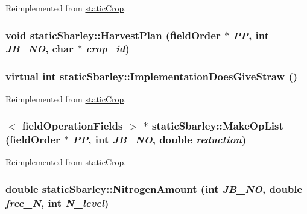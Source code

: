 Reimplemented from \hyperlink{classstatic_crop_afe0cb8a7831afa941a37338f05227d67}{staticCrop}.\hypertarget{classstatic_sbarley_abdb535e92f8862e38dc0f6860d54cd80}{
\subsubsection[{HarvestPlan}]{\setlength{\rightskip}{0pt plus 5cm}void staticSbarley::HarvestPlan ({\bf fieldOrder} $\ast$ {\em PP}, \/  int {\em JB\_\-NO}, \/  char $\ast$ {\em crop\_\-id})}}
\label{classstatic_sbarley_abdb535e92f8862e38dc0f6860d54cd80}
\hypertarget{classstatic_sbarley_a0d32acc147f8af10e83d0292396db1d2}{
\subsubsection[{ImplementationDoesGiveStraw}]{\setlength{\rightskip}{0pt plus 5cm}virtual int staticSbarley::ImplementationDoesGiveStraw ()}}
\label{classstatic_sbarley_a0d32acc147f8af10e83d0292396db1d2}


Reimplemented from \hyperlink{classstatic_crop_a9e8458d1bb0bab4c9a7d05f47fe24537}{staticCrop}.\hypertarget{classstatic_sbarley_a2494676d7dc13d8cc4f860b7f245ca9e}{
\subsubsection[{MakeOpList}]{$<$ {\bf fieldOperationFields} $>$ $\ast$ staticSbarley::MakeOpList ({\bf fieldOrder} $\ast$ {\em PP}, \/  int {\em JB\_\-NO}, \/  double {\em reduction})}}
\label{classstatic_sbarley_a2494676d7dc13d8cc4f860b7f245ca9e}


Reimplemented from \hyperlink{classstatic_crop_a9b67ef1ae531a3afb32b63a4aeb5916b}{staticCrop}.\hypertarget{classstatic_sbarley_adc52f0655ebee0391877abcacffc3084}{
\subsubsection[{NitrogenAmount}]{\setlength{\rightskip}{0pt plus 5cm}double staticSbarley::NitrogenAmount (int {\em JB\_\-NO}, \/  double {\em free\_\-N}, \/  int {\em N\_\-level})}}
\label{classstatic_sbarley_adc52f0655ebee0391877abcacffc3084}


